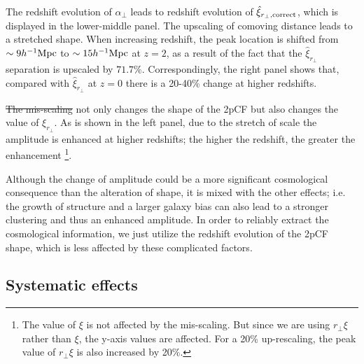 \documentclass[iop]{emulateapj}
\providecommand{\DIFadd}[1]{{\protect\color{blue}\uwave{#1}}} %
\providecommand{\DIFdel}[1]{{\protect\color{red}\sout{#1}}}                      %
\providecommand{\DIFaddbegin}{} %
\providecommand{\DIFaddend}{} %
\providecommand{\DIFdelbegin}{} %
\providecommand{\DIFdelend}{} %
\begin{document}
The redshift evolution of $\alpha_{\perp}$ leads to redshift evolution of 
$\hat \xi_{r_\perp, \rm correct}$,
which is displayed in the lower-middle panel.
The upscaling of comoving distance leads to a stretched shape.
When increasing redshift,
the peak location is shifted from $\sim9h^{-1} \rm Mpc$ to $\sim15 h^{-1}\rm Mpc$ at $z=2$,
as a result of the fact that the $\hat\xi_{r_{\perp}}$ separation is upscaled by $71.7\%$.
Correspondingly, the right panel shows that, 
compared with $\hat \xi_{r_\perp}$ at $z=0$ there is a 20-40\% change at higher redshifts.

\DIFdelbegin \DIFdel{The mis-scaling }\DIFdelend \DIFaddbegin \DIFadd{This scaling }\DIFaddend not only changes the shape of the 2pCF but also changes the value of $ \xi_{r_\perp}$. %
As is shown in the left panel, due to the stretch of scale the amplitude is enhanced at higher redshifts;
the higher the redshift, the greater the enhancement
\footnote{The value of $\xi$ is not affected by the mis-scaling. 
But since we are using $r_\perp\xi$ rather than $\xi$, the y-axis values are affected. 
For a 20\% up-rescaling, the peak value of $r_\perp\xi$ is also increased by 20\%.}.%

Although the change of amplitude could be a more significant cosmological consequence 
than the alteration of shape,
it is mixed with the other effects; i.e.
the growth of structure and a larger galaxy bias can also lead to a stronger clustering and thus an enhanced amplitude.
In order to reliably extract the cosmological information, 
we just utilize the redshift evolution of the 2pCF shape, 
which is less affected by these complicated factors.


\subsection{Systematic effects}
\end{document}
